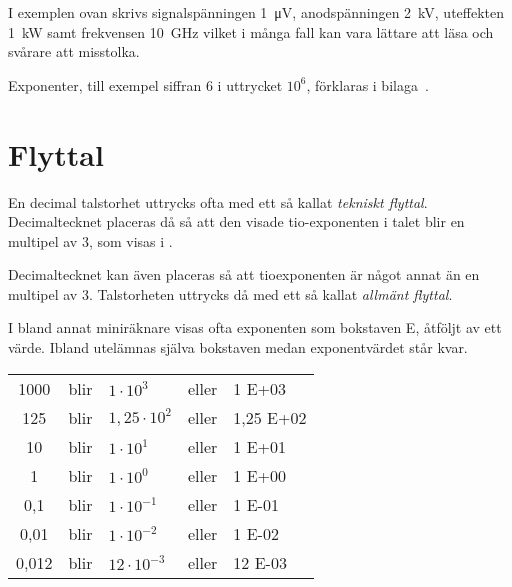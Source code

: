 \begin{table*}[b]
\begin{tabular}{|Sllll|}
      \hline
    \end{tabular}
  \label{tab:prefix}
\end{table*}

I exemplen ovan skrivs signalspänningen \qty{1}{\micro\volt}, anodspänningen
\qty{2}{\kilo\volt}, uteffekten \qty{1}{\kilo\watt} samt frekvensen
\qty{10}{\giga\hertz} vilket i många fall kan vara lättare att läsa och svårare
att misstolka.

Exponenter, till exempel siffran 6 i uttrycket \(10^6\), förklaras i
bilaga~.


\section{Flyttal}

En decimal talstorhet uttrycks ofta med ett så kallat \emph{tekniskt flyttal}.
Decimaltecknet placeras då så att den visade tio-exponenten i talet blir en
multipel av 3, som visas i .

Decimaltecknet kan även placeras så att tioexponenten är något annat än en
multipel av 3.
Talstorheten uttrycks då med ett så kallat \emph{allmänt flyttal}.

I bland annat miniräknare visas ofta exponenten som bokstaven E, åtföljt av ett
värde.
Ibland utelämnas själva bokstaven medan exponentvärdet står kvar.

\bigskip

\noindent\begin{tabular}{Sllll}
1000  & blir & \(1    \cdot 10^3  \) & eller & 1 E+03 \\
125   & blir & \(1,25 \cdot 10^2  \) & eller & 1,25 E+02 \\
10    & blir & \(1    \cdot 10^1  \) & eller & 1 E+01 \\
1     & blir & \(1    \cdot 10^0  \) & eller & 1 E+00 \\
0,1   & blir & \(1    \cdot 10^{-1}\) & eller & 1 E-01 \\
0,01  & blir & \(1    \cdot 10^{-2}\) & eller & 1 E-02 \\
0,012 & blir & \(12   \cdot 10^{-3}\) & eller & 12 E-03 \\
\end{tabular}


